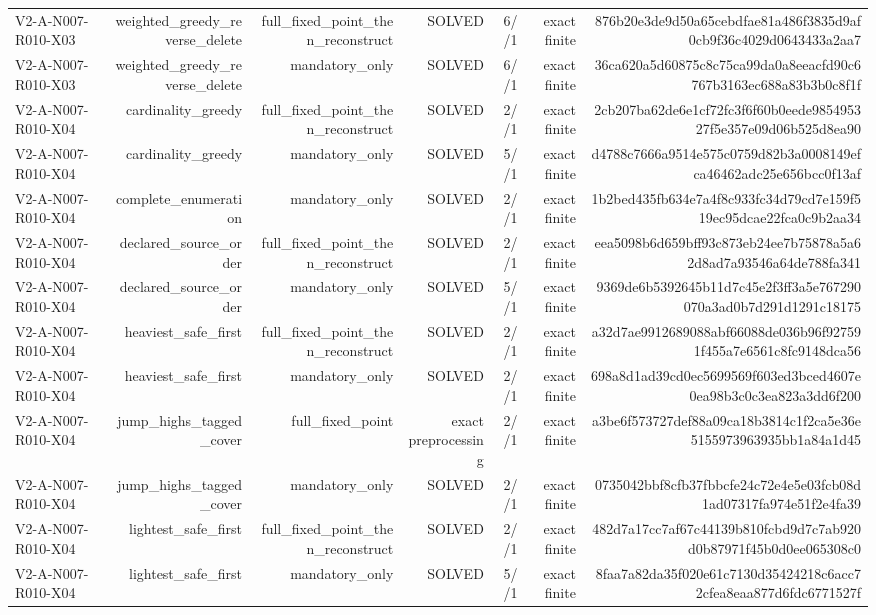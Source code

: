 {\begin{longtable}{lrrrrrr}
V2-A-N007-R010-X03 & weighted\_greedy\_reverse\_delete & full\_fixed\_point\_then\_reconstruct & SOLVED & 6//1 & exact finite & 876b20e3de9d50a65cebdfae81a486f3835d9af0cb9f36c4029d0643433a2aa7 \\
V2-A-N007-R010-X03 & weighted\_greedy\_reverse\_delete & mandatory\_only & SOLVED & 6//1 & exact finite & 36ca620a5d60875c8c75ca99da0a8eeacfd90c6767b3163ec688a83b3b0c8f1f \\
V2-A-N007-R010-X04 & cardinality\_greedy & full\_fixed\_point\_then\_reconstruct & SOLVED & 2//1 & exact finite & 2cb207ba62de6e1cf72fc3f6f60b0eede985495327f5e357e09d06b525d8ea90 \\
V2-A-N007-R010-X04 & cardinality\_greedy & mandatory\_only & SOLVED & 5//1 & exact finite & d4788c7666a9514e575c0759d82b3a0008149efca46462adc25e656bcc0f13af \\
V2-A-N007-R010-X04 & complete\_enumeration & mandatory\_only & SOLVED & 2//1 & exact finite & 1b2bed435fb634e7a4f8c933fc34d79cd7e159f519ec95dcae22fca0c9b2aa34 \\
V2-A-N007-R010-X04 & declared\_source\_order & full\_fixed\_point\_then\_reconstruct & SOLVED & 2//1 & exact finite & eea5098b6d659bff93c873eb24ee7b75878a5a62d8ad7a93546a64de788fa341 \\
V2-A-N007-R010-X04 & declared\_source\_order & mandatory\_only & SOLVED & 5//1 & exact finite & 9369de6b5392645b11d7c45e2f3ff3a5e767290070a3ad0b7d291d1291c18175 \\
V2-A-N007-R010-X04 & heaviest\_safe\_first & full\_fixed\_point\_then\_reconstruct & SOLVED & 2//1 & exact finite & a32d7ae9912689088abf66088de036b96f927591f455a7e6561c8fc9148dca56 \\
V2-A-N007-R010-X04 & heaviest\_safe\_first & mandatory\_only & SOLVED & 2//1 & exact finite & 698a8d1ad39cd0ec5699569f603ed3bced4607e0ea98b3c0c3ea823a3dd6f200 \\
V2-A-N007-R010-X04 & jump\_highs\_tagged\_cover & full\_fixed\_point & exact preprocessing & 2//1 & exact finite & a3be6f573727def88a09ca18b3814c1f2ca5e36e5155973963935bb1a84a1d45 \\
V2-A-N007-R010-X04 & jump\_highs\_tagged\_cover & mandatory\_only & SOLVED & 2//1 & exact finite & 0735042bbf8cfb37fbbcfe24c72e4e5e03fcb08d1ad07317fa974e51f2e4fa39 \\
V2-A-N007-R010-X04 & lightest\_safe\_first & full\_fixed\_point\_then\_reconstruct & SOLVED & 2//1 & exact finite & 482d7a17cc7af67c44139b810fcbd9d7c7ab920d0b87971f45b0d0ee065308c0 \\
V2-A-N007-R010-X04 & lightest\_safe\_first & mandatory\_only & SOLVED & 5//1 & exact finite & 8faa7a82da35f020e61c7130d35424218c6acc72cfea8eaa877d6fdc6771527f \\

\end{longtable}}
